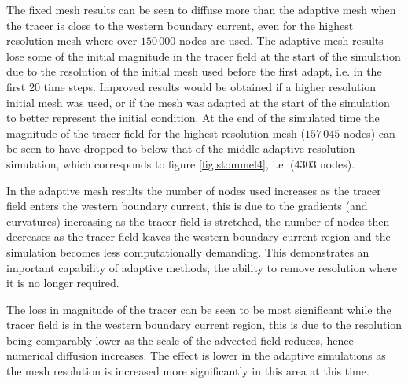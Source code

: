 The fixed mesh results can be seen to diffuse more than the adaptive mesh
when the tracer is close to the western boundary current, even for the highest resolution mesh
where over $150\,000$ nodes are used. The adaptive mesh results lose
some of the initial magnitude in the tracer field at the start of the simulation due to the resolution of the
initial mesh used before the first adapt, i.e. in the first 20 time steps.
Improved results would be obtained if a higher resolution initial mesh was used,
or if the mesh was adapted at the start of the simulation to better represent the initial condition.
At the end of the simulated time the magnitude of the tracer field for the highest resolution mesh ($157\, 045$ nodes)
can be seen to have dropped to below that of the middle adaptive resolution simulation, which corresponds to
figure \ref{fig:stommel4}, i.e. ($4303$ nodes).


In the adaptive mesh results the number of nodes used increases as the tracer field
enters the western boundary current, this is due to the gradients (and curvatures)
increasing as the tracer field is stretched, the number of nodes then decreases as
the tracer field leaves the western boundary current region and the simulation becomes
less computationally demanding. This demonstrates an important capability of adaptive methods,
the ability to remove resolution where it is no longer required.

The loss in magnitude of the tracer can be seen to be most significant while the
tracer field is in the western boundary current region, this is due to the resolution
being comparably lower as the scale of the advected field reduces, hence numerical
diffusion increases. The effect is lower in the adaptive simulations as the mesh resolution is increased
more significantly in this area at this time.

